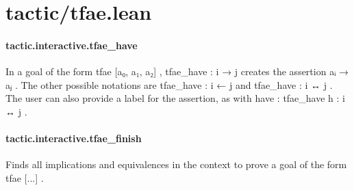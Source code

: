 \documentclass{article}
\begin{document}
\section{tactic/tfae.lean}\paragraph{tactic.interactive.tfae\_have}
\par
In a goal of the form 
\colorbox[RGB]{253,246,227}{{{{\color[RGB]{101, 123, 131} tfae {[}a₀, a₁, a₂{]} }}}},
\colorbox[RGB]{253,246,227}{{{{\color[RGB]{101, 123, 131} tfae\_have : i  }}}{{{\color[RGB]{133, 153, 0} → }}}{{{\color[RGB]{101, 123, 131}  j }}}} creates the assertion 
\colorbox[RGB]{253,246,227}{{{{\color[RGB]{101, 123, 131} aᵢ  }}}{{{\color[RGB]{133, 153, 0} → }}}{{{\color[RGB]{101, 123, 131}  aⱼ }}}}. The other possible
notations are 
\colorbox[RGB]{253,246,227}{{{{\color[RGB]{101, 123, 131} tfae\_have : i ← j }}}} and 
\colorbox[RGB]{253,246,227}{{{{\color[RGB]{101, 123, 131} tfae\_have : i  }}}{{{\color[RGB]{181, 137, 0} ↔ }}}{{{\color[RGB]{101, 123, 131}  j }}}}. The user can
also provide a label for the assertion, as with 
\colorbox[RGB]{253,246,227}{{{{\color[RGB]{133, 153, 0} have }}}}: 
\colorbox[RGB]{253,246,227}{{{{\color[RGB]{101, 123, 131} tfae\_have h : i  }}}{{{\color[RGB]{181, 137, 0} ↔ }}}{{{\color[RGB]{101, 123, 131}  j }}}}.
\paragraph{tactic.interactive.tfae\_finish}
\par
Finds all implications and equivalences in the context
to prove a goal of the form 
\colorbox[RGB]{253,246,227}{{{{\color[RGB]{101, 123, 131} tfae {[}...{]} }}}}.
\end{document}
